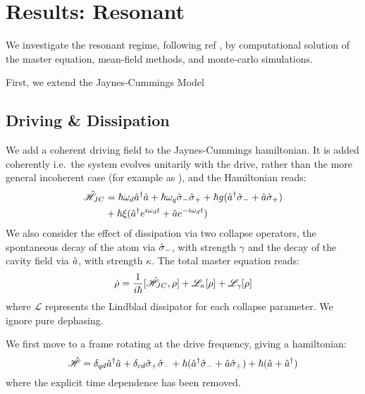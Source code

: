 \section{Results: Resonant}
We investigate the resonant regime, following ref \cite{Carmichael2015}, by computational solution of the master equation, mean-field methods, and monte-carlo simulations.

First, we extend the Jaynes-Cummings Model

\subsection{Driving \& Dissipation}
We add a coherent driving field to the Jaynes-Cummings hamiltonian. It is added coherently i.e.\ the system evolves unitarily with the drive, rather than the more general incoherent case (for example as \cite{Xu2014}), and the Hamiltonian reads:
\begin{align}
    \hat{\mathscr{H}}_{JC} &= \hbar \omega_d {\hat{a}^\dagger} \hat{a} + \hbar \omega_q \hat{\sigma}_- \hat{\sigma}_+ +\hbar g ({\hat{a}^\dagger} \hat{\sigma}_-+ \hat{a} \hat{\sigma}_+)\\
    & + \hbar \xi ({\hat{a}^\dagger} e^{i\omega_d t} + \hat{a} e^{-i\omega_d t})
\end{align}
We also consider the effect of dissipation via two collapse operators, the spontaneous decay of the atom via $\hat{\sigma}_-$, with strength $\gamma$ and the decay of the cavity field via $\hat{a}$, with strength $\kappa$. The total master equation reads:
\begin{equation}
  \dot{\rho} = \frac{1}{i\hbar}[\hat{\mathscr{H}}_{JC}, \rho] + \mathscr{L}_\kappa[\rho] + \mathscr{L}_\gamma[\rho]
\end{equation}
where $\mathscr{L}$ represents the Lindblad dissipator for each collapse parameter. 
We ignore pure dephasing.

We first move to a frame rotating at the drive frequency, giving a hamiltonian:
\begin{equation}
  \hat{\mathscr{H}} = \delta_{qd} {\hat{a}^\dagger} \hat{a} + \delta_{cd} \hat{\sigma}_+ \hat{\sigma}_- + \hbar ({\hat{a}^\dagger} \hat{\sigma}_- + \hat{a} \hat{\sigma}_+) + \hbar (\hat{a} + {\hat{a}^\dagger})
\end{equation}
where the explicit time dependence has been removed.
